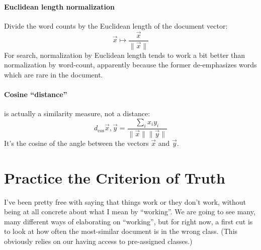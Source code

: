\documentclass{article}
\begin{document}
\paragraph*{Euclidean length normalization} Divide the word counts by the
Euclidean length of the document vector:
\[
\vec{x} \mapsto \frac{\vec{x}}{\| \vec{x} \|}
\]
For search, normalization by Euclidean length tends to work a bit better than
normalization by word-count, apparently because the former de-emphasizes words
which are rare in the document.

\paragraph*{Cosine ``distance''} is actually a similarity measure, not a distance:
\[
d_{\cos{}}{\vec{x},\vec{y}} = \frac{\sum_{i}{x_i y_i}}{\| \vec{x}\| \|\vec{y}\|}
\]
It's the cosine of the angle between the vectors $\vec{x}$ and $\vec{y}$.

\newpage

\section{Practice the Criterion of Truth}

I've been pretty free with saying that things work or they don't work, without
being at all concrete about what I mean by ``working''.  We are going to see
many, many different ways of elaborating on ``working'', but for right now, a
first cut is to look at how often the most-similar document is in the wrong
class.  (This obviously relies on our having access to pre-assigned
classes.)

\end{document}
